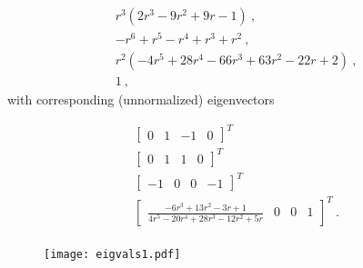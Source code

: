 \documentclass[twoside]{article}
\begin{document}
\begin{gather}
r^3 \left(2 r^3-9 r^2+9 r-1\right)\ ,\\
-r^6+r^5-r^4+r^3+r^2\ ,\\
r^2 \left(-4 r^5+28 r^4-66 r^3+63 r^2-22 r+2\right)\ ,\\
1\ ,
\end{gather}
with corresponding (unnormalized) eigenvectors

\begin{gather}
\begin{bmatrix}
0 & 1 & -1 & 0
\end{bmatrix}^T\, \\
\begin{bmatrix}
0 & 1 & 1 & 0
\end{bmatrix}^T\, \\
\begin{bmatrix}
-1 & 0 & 0 & -1
\end{bmatrix}^T\, \\
\begin{bmatrix}
\frac{-6 r^3+13 r^2-3 r+1}{4 r^5-20 r^4+28 r^3-12 r^2+5 r} & 0 & 0 & 1
\end{bmatrix}^T\ . \\
\end{gather}

\begin{figure}[h!]
    \centering
    \texttt{[image: eigvals1.pdf]}
\end{figure}
\end{document}
